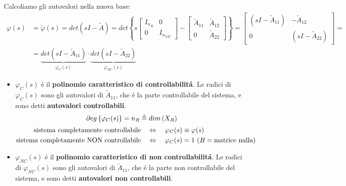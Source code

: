 \documentclass[../main.tex]{subfiles}
\begin{document}
		Calcoliamo gli autovalori nella nuova base:
		\begin{align*}
			\varphi(s) &= \tilde \varphi(s) = det(sI-\tilde A) = det\left\lbrace s
			\begin{bmatrix}
				I_{n_R} & 0\\
				0 & I_{n_{NR}}
			\end{bmatrix} -
			\begin{bmatrix}
				\tilde A_{11} & \tilde A_{12}\\
				0 & \tilde A_{22}
			\end{bmatrix} \right\rbrace =
			\begin{bmatrix}
				(sI-\tilde A_{11}) & -\tilde A_{12}\\
				0 & (sI-\tilde A_{22})
			\end{bmatrix} =
			\\
			&= \underbrace{det(sI-\tilde A_{11})}_{\varphi_C(s)} \cdot \underbrace{det(sI-\tilde A_{22})}_{\varphi_{NC}(s)}
		\end{align*}
		\begin{itemize}
			\item
				$ \varphi_C(s) $ \'e il \textbf{polinomio caratteristico di controllabilit\'a}. Le radici di $ \varphi_C(s) $ sono gli autovalori di $ \tilde A_{11} $, che \'e la parte controllabile del sistema, e sono detti \textbf{autovalori controllabili}.
				\[
					\partial eg \left\lbrace \varphi_C(s) \right\rbrace = n_R \triangleq dim\left( X_R \right)
				\]
				\[
					\begin{aligned}
						\text{sistema completamente controllabile} &\quad\Leftrightarrow\quad \varphi_C(s) \equiv \varphi(s)
						\\
						\text{sistema completamente \text{NON} controllabile} &\quad\Leftrightarrow\quad \varphi_C(s) = 1\ (B = \text{matrice nulla})
					\end{aligned}
				\]
			\item
				$ \varphi_{NC}(s) $ \'e il \textbf{polinomio caratteristico di non controllabilit\'a}. Le radici di $ \varphi_{NC}(s) $ sono gli autovalori di $ \tilde A_{11} $, che \'e la parte non controllabile del sistema, e sono detti \textbf{autovalori non controllabili}.
		\end{itemize}
	
\end{document}
